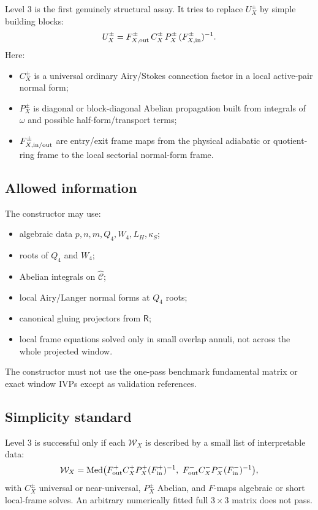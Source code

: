 \documentclass[11pt]{article}
\newcommand{\calW}{\mathcal W}
\newcommand{\hatC}{\widehat{\mathcal C}}
\newcommand{\Rop}{\mathsf R}
\newcommand{\Med}{\operatorname{Med}}
\begin{document}
Level 3 is the first genuinely structural assay. It tries to replace $U_X^\pm$ by simple building blocks:
\begin{equation}
\label{eq:level3-factor}
U_X^\pm=F_{X,{\rm out}}^\pm\,C_X^\pm\,P_X^\pm\,(F_{X,{\rm in}}^\pm)^{-1}.
\end{equation}
Here:
\begin{itemize}
  \item $C_X^\pm$ is a universal ordinary Airy/Stokes connection factor in a local active-pair normal form;
  \item $P_X^\pm$ is diagonal or block-diagonal Abelian propagation built from integrals of $\omega$ and possible half-form/transport terms;
  \item $F_{X,{\rm in/out}}^\pm$ are entry/exit frame maps from the physical adiabatic or quotient-ring frame to the local sectorial normal-form frame.
\end{itemize}

\subsection{Allowed information}

The constructor may use:
\begin{itemize}
  \item algebraic data $p,n,m,Q_4,W_4,L_H,\kappa_S$;
  \item roots of $Q_4$ and $W_4$;
  \item Abelian integrals on $\hatC$;
  \item local Airy/Langer normal forms at $Q_4$ roots;
  \item canonical gluing projectors from $\Rop$;
  \item local frame equations solved only in small overlap annuli, not across the whole projected window.
\end{itemize}
The constructor must not use the one-pass benchmark fundamental matrix or exact window IVPs except as validation references.

\subsection{Simplicity standard}

Level 3 is successful only if each $\calW_X$ is described by a small list of interpretable data:
\begin{equation}
\calW_X=\Med\bigl(F_{\rm out}^+C_X^+P_X^+(F_{\rm in}^+)^{-1},\ F_{\rm out}^-C_X^-P_X^-(F_{\rm in}^-)^{-1}\bigr),
\end{equation}
with $C_X^\pm$ universal or near-universal, $P_X^\pm$ Abelian, and $F$-maps algebraic or short local-frame solves. An arbitrary numerically fitted full $3\times3$ matrix does not pass.
\end{document}

